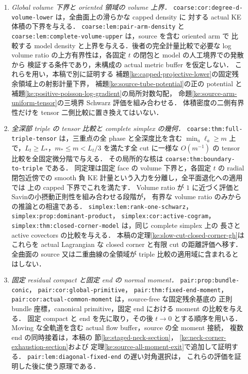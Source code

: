\begin{enumerate}
\item \emph{Global volume 下界と oriented 領域の volume 上界．}
\texttt{coarse:cor:degree-d-volume-lower} は，全曲面上の滑らかな capped density に
対する actual KE 体積の下界を与える．
\texttt{coarse:lem:pair-arm-density} と
\texttt{coarse:lem:complete-volume-upper} は，source を含む oriented arm で
比較する model density と上界を与える．後者の完全計量比較で必要な
log volume ratio の上方有界性は，各固定 $t$ の閉包と model の人工境界での発散から
検証する条件であり，未構成の actual metric buffer を仮定しない．
これらを用い，本稿で別に証明する
補題\ref{ke:capped-projective-lower}の固定残余領域上の射影計量下界，
補題\ref{ke:source-tube-potential}の正の potential と
補題\ref{ke:positive-poisson-log-gradient}の局所対数勾配，
命題\ref{ke:source-arm-uniform-tensor}の三境界 Schwarz 評価を組み合わせる．
体積密度の二側有界性だけを tensor 二側比較に置き換えてはいない．

\item \emph{全深部 triple の tensor 比較と complete simplex の幾何．}
\texttt{coarse:thm:full-triple-tensor} は，三重点の全 phase と全深度比を含む
$\min_a\ell_a\ge m$ 上で，$L_t\ge L_*$，$m_*\le m<L_t/3$ を満たす全 cut に一様な
$O(m^{-1})$ の tensor 比較を全固定微分階で与える．
その局所的な核は \texttt{coarse:thm:boundary-to-triple} である．
同定理は固定 face の volume 下界と，各固定 $t$ の radial 閉包近傍での
smooth 負 KE 計量という入力を分離し，全平面退化への適用では
上の capped 下界でこれを満たす．
Volume ratio が $1$ に近づく評価と
Savin\cite[Theorem~1.3]{SavinSmall}の小摂動正則性を組み合わせる段階が，
有界な volume ratio のみからの推論との相違である．
\texttt{simplex:lem:rank-one-schwarz}，
\texttt{simplex:prop:dominant-product}，
\texttt{simplex:cor:active-cogram}，
\texttt{simplex:thm:closed-corner-model} は，同じ complete simplex 上の
長さと active covectors の比較を与える．
本稿の定理\ref{ke:slow-cut-closed-corner-gh}はこれらを
actual Lagrangian な closed corner と有限 cut の距離評価へ移す．
全曲面の source 又は二重曲線の全領域が triple 比較の適用域に含まれるとはしない．

\item \emph{固定 residual compact と固定 end の normal moment．}
\texttt{pair:prop:bundle-conic}，
\texttt{pair:cor:global-primitive}，
\texttt{pair:thm:fixed-end-moment}，
\texttt{pair:cor:actual-common-moment} は，source-free な固定残余基底の
正則 bundle 座標，canonical primitive，固定 end における moment の比較を与える．
固定 compact と end を先に取り，その後 $t\to0$ とする順序を用いる．
Moving な全軌道を含む actual flow buffer，source の全 moment 接続，
複数 end の同時接着は，本稿の
節\ref{ke:staged-neck-section}，
\ref{ke:neck-corner-exhaustion-section}および
定理\ref{ke:source-all-moment-exit}で追加して証明する．
\texttt{pair:lem:diagonal-fixed-end} の遅い対角選択は，
これらの評価を証明した後に使う原理である．


\end{enumerate}
